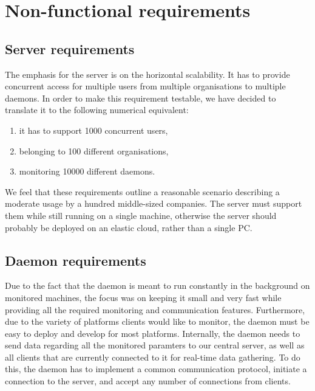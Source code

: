 \documentclass{l3proj}
\begin{document}
\section{Non-functional requirements}


\subsection{Server requirements}

The emphasis for the server is on the horizontal scalability. It has to provide concurrent access for multiple users from multiple organisations to multiple daemons. In order to make this requirement testable, we have decided to translate it to the following numerical equivalent:
\begin{enumerate}
\item it has to support 1000 concurrent users,
\item belonging to 100 different organisations,
\item monitoring 10000 different daemons.
\end{enumerate}

We feel that these requirements outline a reasonable scenario describing a moderate usage by a hundred middle-sized companies. The server must support them while still running on a single machine, otherwise the server should probably be deployed on an elastic cloud, rather than a single PC.

\subsection{Daemon requirements}

Due to the fact that the daemon is meant to run constantly in the background on monitored machines, the focus was on keeping it small and very fast while providing all the required monitoring and communication features.
Furthermore, due to the variety of platforms clients would like to monitor, the daemon must be easy to deploy and develop for most platforms.
Internally, the daemon needs to send data regarding all the monitored paramters to our central server, as well as all clients that are currently connected to it for real-time data gathering.
To do this, the daemon has to implement a common communication protocol, initiate a connection to the server, and accept any number of connections from clients.
\end{document}
